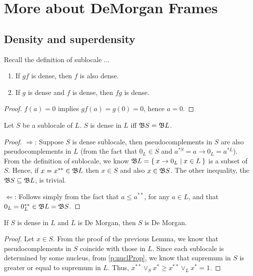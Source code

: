 \chapter{More about DeMorgan Frames}

\section{Density and superdensity}
Recall the definition of sublocale ...

\begin{lemma}\label{p:denseProperties}
    \begin{enumerate}
        \item If $gf$ is dense, then $f$ is also dense.
        \item If $g$ is dense and $f$ is dense, then $fg$ is dense.
    \end{enumerate}
\end{lemma}
\begin{proof}
    $f(a) = 0$ implies $gf(a) = g(0) = 0$, hence $a = 0$.
\end{proof}

\begin{lemma}\label{p:denseProperties2}
    Let $S$ be a sublocale of $L$. $S$ is dense in $L$ iff $\mathfrak{B} S = \mathfrak{B} L$.
\end{lemma}
\begin{proof}
    $\Rightarrow$: Suppose $S$ is dense sublocale, then pseudocomplements in $S$ are also pseudocomplements in $L$ (from the fact that $0_L\in S$ and $a^{*S} = a\to 0_L = a^{*L}$).
    From the definition of sublocale, we know $\mathfrak{B} L = \Set{ x\to 0_L | x\in L}$ is a subset of $S$. Hence, if $x = x^{**}\in \mathfrak{B} L$ then $x \in S$ and also $x \in \mathfrak{B} S$. The other inequality, the $\mathfrak{B} S\subseteq \mathfrak{B} L$, is trivial.

    $\Leftarrow$: Follows simply from the fact that $a\leq a^{**}$, for any $a\in L$, and that $0_L = 0_L^{**} \in \mathfrak{B} L = \mathfrak{B} S$.
\end{proof}

\begin{proposition}\label{p:denseReflectDeMorgan}
    If $S$ is dense in $L$ and $L$ is De Morgan, then $S$ is De Morgan.
\end{proposition}
\begin{proof}
    Let $x\in S$. From the proof of the previous Lemma, we know that pseudocomplements in $S$ coincide with those in $L$. Since each sublocale is determined by some nucleus, from \ref{p:nuclProp}, we know that supremum in $S$ is greater or equal to supremum in $L$. Thus, $x^{**}\vee_S x^* \geq x^{**}\vee_L x^* = 1$.
\end{proof}

